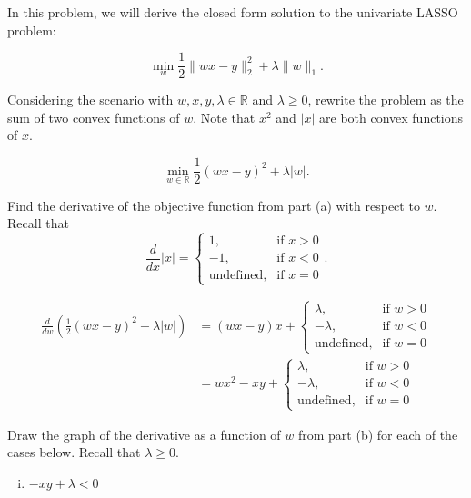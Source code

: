 In this problem, we will derive the closed form solution to the univariate LASSO problem:

 \[
     \min_{w} \frac{1}{2}\|wx - y\|^{2}_{2} + \lambda \|w\|_{1}
.\]


\begin{Parts}

    \Part Considering the scenario with $w, x, y, \lambda \in \mathbb{R}$ and
    $\lambda \geq 0$, rewrite the problem as the sum of two convex functions of
    $w$. Note that $x^{2}$ and $|x|$ are both convex functions of $x$.

\begin{solution}
\[
    \min_{w \in \mathbb{R}} \frac{1}{2} \left( wx - y \right)^{2} + \lambda |w|
.\] 
\end{solution}

\Part Find the derivative of the objective function from part (a) with respect
to $w$. Recall that
\[
    \frac{d}{dx} |x| = \begin{cases}
        1, & \text{if } x > 0 \\
        -1, & \text{if } x < 0 \\
    \text{undefined}, & \text{if } x = 0 \end{cases}
.\] 

\begin{solution}
    \begin{align*}
         \frac{d}{d w} \left( \frac{1}{2} \left( wx - y \right)^{2} + \lambda
         |w| \right) &= \left( wx - y \right)x + \begin{cases}
             \lambda, & \text{if }  w > 0 \\
             -\lambda, & \text{if } w < 0 \\
             \text{undefined}, & \text{if } w = 0
         \end{cases}
         \\
                               &= wx^{2} - xy + \begin{cases}
             \lambda, & \text{if }  w > 0 \\
             -\lambda, & \text{if } w < 0 \\
             \text{undefined}, & \text{if } w = 0
         \end{cases}
     \end{align*}
\end{solution}

\Part Draw the graph of the derivative as a function of $w$ from part (b) for each of the cases
below. Recall that $\lambda \geq 0$.
\begin{enumerate}[i.]
    \item $-xy + \lambda < 0$


\end{enumerate}
\end{Parts}
